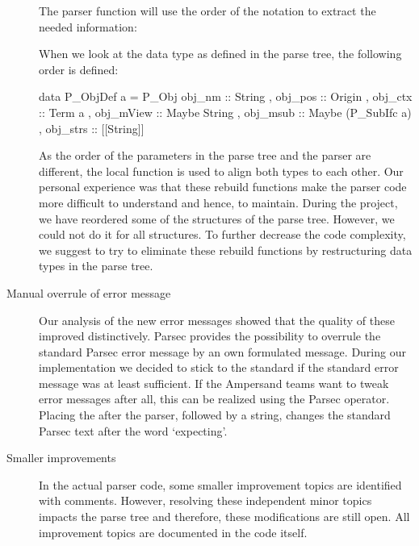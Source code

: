 \begin{description}
   The parser function will use the order of the notation to extract the needed information:
%
   When we look at the data type as defined in the parse tree, the following order is defined:
   \begin{haskell}
   data P_ObjDef a =
      P_Obj { obj_nm :: String          
            , obj_pos :: Origin  
            , obj_ctx :: Term a
            , obj_mView :: Maybe String 
            , obj_msub :: Maybe (P_SubIfc a)  
            , obj_strs :: [[String]]
            }
    \end{haskell}
    As the order of the parameters in the parse tree and the parser are different, the local function  is used to align both types to each other.
   Our personal experience was that these rebuild functions make the parser code more difficult to understand and hence, to maintain.
   During the project, we have reordered some of the structures of the parse tree.
   However, we could not do it for all structures.
   To further decrease the code complexity, we suggest to try to eliminate these rebuild functions by restructuring data types in the parse tree.

  \item[Manual overrule of error message]
    Our analysis of the new error messages showed that the quality of these improved distinctively.
    Parsec provides the possibility to overrule the standard Parsec error message by an own formulated message.
    During our implementation we decided to stick to the standard if the standard error message was at least sufficient.
    If the Ampersand teams want to tweak error messages after all, this can be realized using the  Parsec operator.
    Placing the  after the parser, followed by a string, changes the standard Parsec text after the word `expecting'.

  \item [Smaller improvements]
    In the actual parser code, some smaller improvement topics are identified with comments.
    However, resolving these independent minor topics impacts the parse tree and therefore, these modifications are still open.
    All improvement topics are documented in the code itself. 
\end{description}

